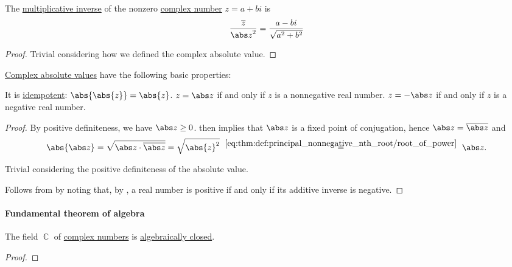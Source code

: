 \begin{proposition}\label{thm:complex_multiplicative_inverse}
  The \hyperref[def:semiring]{multiplicative inverse} of the nonzero \hyperref[def:complex_numbers]{complex number} \( z = a + bi \) is
  \begin{equation}\label{eq:thm:complex_multiplicative_inverse}
    \frac {\oline z} {{\abs z}^2} = \frac {a - bi} {\sqrt{a^2 + b^2}}
  \end{equation}
\end{proposition}
\begin{proof}
  Trivial considering how we defined the complex absolute value.
\end{proof}

\begin{proposition}\label{thm:def:complex_absolute_value}
  \hyperref[def:complex_absolute_value]{Complex absolute values} have the following basic properties:
  \begin{thmenum}
     It is \hyperref[def:idempotent_function]{idempotent}: \( \abs{\abs{z}} = \abs{z} \).
     \( z = \abs z \) if and only if \( z \) is a nonnegative real number.
     \( z = -\abs z \) if and only if \( z \) is a negative real number.
  \end{thmenum}
\end{proposition}
\begin{proof}
   By positive definiteness, we have \( \abs z \geq 0 \).  then implies that \( \abs z \) is a fixed point of conjugation, hence \( \abs z = \oline{\abs z} \) and
  \begin{equation*}
    \abs{\abs z}
    =
    \sqrt{ \abs z \cdot \oline{\abs z} }
    =
    \sqrt { \abs{z}^2 }
    \reloset {\eqref{eq:thm:def:principal_nonnegative_nth_root/root_of_power}} =
    \abs z.
  \end{equation*}

   Trivial considering the positive definiteness of the absolute value.

   Follows from  by noting that, by , a real number is positive if and only if its additive inverse is negative.
\end{proof}

\paragraph{Fundamental theorem of algebra}

\begin{theorem}\label{thm:fundamental_theorem_of_algebra}
  The field \( \BbbC \) of \hyperref[def:complex_numbers]{complex numbers} is \hyperref[def:algebraically_closed_field]{algebraically closed}.
\end{theorem}
\begin{proof}
\end{proof}
